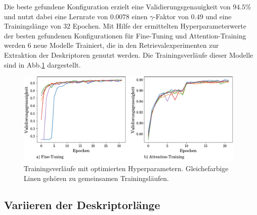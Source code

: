 Die beste gefundene Konfiguration erzielt eine Validierungsgenauigkeit von $94.5\%$ und nutzt dabei eine Lernrate von $0.0078$ einen $\gamma$-Faktor von $0.49$ und eine Trainingslänge von $32$ Epochen. 
Mit Hilfe der ermittelten Hyperparameterwerte der besten gefundenen Konfigurationen für Fine-Tuning und Attention-Training werden $6$ neue Modelle Trainiert, die in den Retrievalexperimenten zur Extraktion der Deskriptoren genutzt werden. Die Trainingsverläufe dieser Modelle sind in Abb.\ref{optimized_runs} dargestellt.
\begin{figure}[h]
\includegraphics[scale=0.75]{NNOPT/6_model_verlauf}
\caption{Trainingsverläufe mit optimierten Hyperparametern. Gleichefarbige Linen gehören zu gemeinsamen Trainingsläufen.}
\label{optimized_runs}
\end{figure}

\subsection{Variieren der Deskriptorlänge}\label{pca_experiments}

